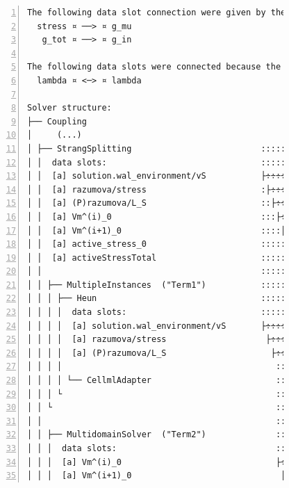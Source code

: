 \begin{figure}
\centering
\begin{framed}
\begin{Verbatim}[fontsize=\scriptsize\ttfamily,numbers=left]
The following data slot connection were given by the setting "connectedSlots":
  stress ¤ ──> ¤ g_mu  
   g_tot ¤ ──> ¤ g_in  

The following data slots were connected because the names appeared in both terms:
  lambda ¤ <─> ¤ lambda

Solver structure: 
├── Coupling  
│     (...)
│ ├── StrangSplitting                          ::::::::::::::           
│ │  data slots:                               ::::::::::::::           
│ │  [a] solution.wal_environment/vS           ├÷÷÷÷÷÷÷÷÷÷÷÷÷─── vm ¤0  x
│ │  [a] razumova/stress                       :├÷÷÷÷÷÷÷÷÷÷÷÷stress ¤1  x
│ │  [a] (P)razumova/L_S                       ::├÷÷÷÷÷÷÷÷÷÷÷lambda ¤2<──────────┐
│ │  [a] Vm^(i)_0                              :::├÷÷÷÷÷÷÷÷÷÷vm_old ¤3  x        │
│ │  [a] Vm^(i+1)_0                            ::::├÷÷÷÷÷÷÷÷÷vm_new ¤4  x        │
│ │  [a] active_stress_0                       :::::├÷÷÷÷÷÷÷÷─ g_mu ¤5  x        │
│ │  [a] activeStressTotal                     ::::::├÷÷÷÷÷÷÷ g_tot ¤6─────────┐ │
│ │                                            ::::::::::::::                  │ │
│ │ ├── MultipleInstances  ("Term1")           ::::::::::::::                  │ │
│ │ │ ├── Heun                                 ::::::::::::::                  │ │
│ │ │ │  data slots:                           ::::::::::::::                  │ │
│ │ │ │  [a] solution.wal_environment/vS       ├÷÷÷÷÷÷÷÷÷÷÷÷÷─── vm ¤0<────┬─┐ │ │
│ │ │ │  [a] razumova/stress                    ├÷÷÷÷÷÷÷÷÷÷÷÷stress ¤1───┐ │ │ │ │
│ │ │ │  [a] (P)razumova/L_S                     ├÷÷÷÷÷÷÷÷÷÷÷lambda ¤2  x│ │ │ │ │
│ │ │ │                                           :::::::::::            │ │ │ │ │
│ │ │ │ └── CellmlAdapter                         :::::::::::            │ │ │ │ │
│ │ │ └                                           :::::::::::            │ │ │ │ │
│ │ └                                             :::::::::::            │ │ │ │ │
│ │                                               :::::::::::            │ │ │ │ │
│ │ ├── MultidomainSolver  ("Term2")              :::::::::::            │ │ │ │ │
│ │ │  data slots:                                :::::::::::            │ │ │ │ │
│ │ │  [a] Vm^(i)_0                               ├÷÷÷÷÷÷÷÷÷÷vm_old ¤0<──┼─┘ │ │ │
│ │ │  [a] Vm^(i+1)_0                              ├÷÷÷÷÷÷÷÷÷vm_new ¤1───┼───┘ │ m

\end{Verbatim}
\end{framed}
\end{figure}
